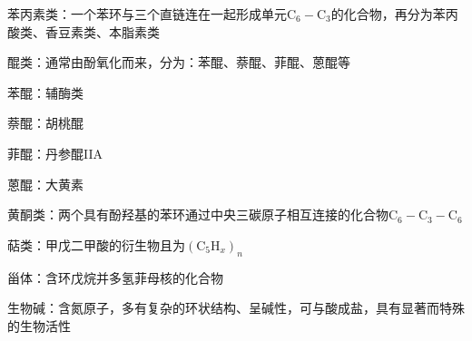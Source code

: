 \begin{notation}
    苯丙素类：一个苯环与三个直链连在一起形成单元$\text{C}_6-\text{C}_3$的化合物，再分为苯丙酸类、香豆素类、本脂素类
\end{notation}
\begin{notation}
    醌类：通常由酚氧化而来，分为：苯醌、萘醌、菲醌、蒽醌等
    \begin{eg}
        苯醌：辅酶类

        萘醌：胡桃醌

        菲醌：丹参醌IIA

        蒽醌：大黄素
    \end{eg}
\end{notation}
\begin{notation}
    黄酮类：两个具有酚羟基的苯环通过中央三碳原子相互连接的化合物$\text{C}_6-\text{C}_3-\text{C}_6$

    萜类：甲戊二甲酸的衍生物且为$\left( \text{C}_5\text{H}_x \right)_{n}$

    甾体：含环戊烷并多氢菲母核的化合物

    生物碱：含氮原子，多有复杂的环状结构、呈碱性，可与酸成盐，具有显著而特殊的生物活性
\end{notation}
